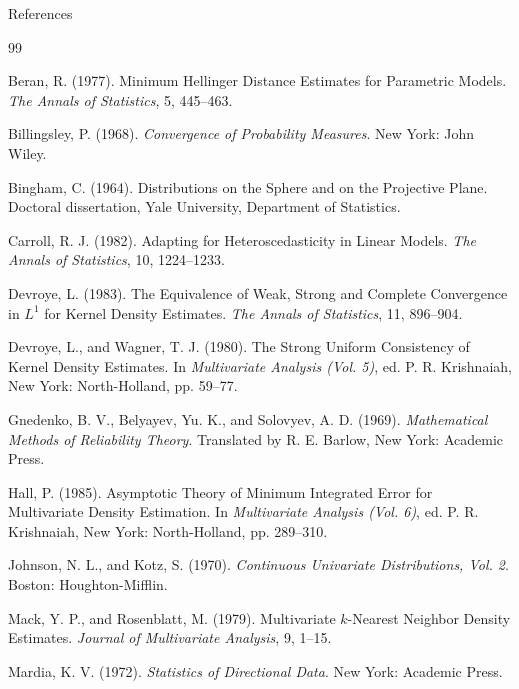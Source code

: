 \begin{frame}[allowframebreaks]{References}
\footnotesize
\begin{thebibliography}{99}

Beran, R. (1977).
\newblock Minimum Hellinger Distance Estimates for Parametric Models.
\newblock \emph{The Annals of Statistics}, 5, 445--463.

Billingsley, P. (1968).
\newblock \emph{Convergence of Probability Measures}.
\newblock New York: John Wiley.

Bingham, C. (1964).
\newblock Distributions on the Sphere and on the Projective Plane.
\newblock Doctoral dissertation, Yale University, Department of Statistics.

Carroll, R. J. (1982).
\newblock Adapting for Heteroscedasticity in Linear Models.
\newblock \emph{The Annals of Statistics}, 10, 1224--1233.

Devroye, L. (1983).
\newblock The Equivalence of Weak, Strong and Complete Convergence in $L^1$ for Kernel Density Estimates.
\newblock \emph{The Annals of Statistics}, 11, 896--904.

Devroye, L., and Wagner, T. J. (1980).
\newblock The Strong Uniform Consistency of Kernel Density Estimates.
\newblock In \emph{Multivariate Analysis (Vol. 5)}, ed. P. R. Krishnaiah, New York: North-Holland, pp. 59--77.

Gnedenko, B. V., Belyayev, Yu. K., and Solovyev, A. D. (1969).
\newblock \emph{Mathematical Methods of Reliability Theory}.
\newblock Translated by R. E. Barlow, New York: Academic Press.

Hall, P. (1985).
\newblock Asymptotic Theory of Minimum Integrated Error for Multivariate Density Estimation.
\newblock In \emph{Multivariate Analysis (Vol. 6)}, ed. P. R. Krishnaiah, New York: North-Holland, pp. 289--310.

Johnson, N. L., and Kotz, S. (1970).
\newblock \emph{Continuous Univariate Distributions, Vol. 2}.
\newblock Boston: Houghton-Mifflin.

Mack, Y. P., and Rosenblatt, M. (1979).
\newblock Multivariate $k$-Nearest Neighbor Density Estimates.
\newblock \emph{Journal of Multivariate Analysis}, 9, 1--15.

Mardia, K. V. (1972).
\newblock \emph{Statistics of Directional Data}.
\newblock New York: Academic Press.


\end{thebibliography}
\end{frame}
